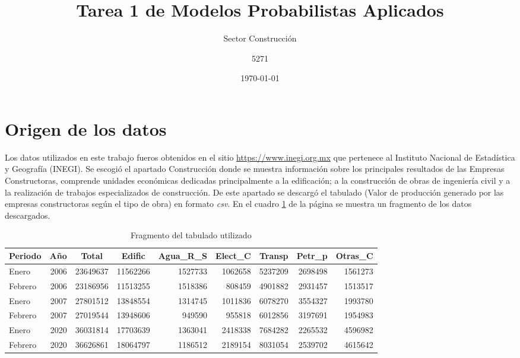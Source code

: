 \documentclass{article}
\title{Tarea 1 de Modelos Probabilistas Aplicados}
\subtitle{Sector Construcción}
\author{5271}
\date{\today}
\begin{document}
\maketitle

\section{Origen de los datos}

Los datos utilizados en este trabajo fueros obtenidos en el sitio \href{https://www.inegi.org.mx/default.html}{https://www.inegi.org.mx} que pertenece al Instituto Nacional de Estadística y Geografía (INEGI). Se escogió el apartado Construcción donde se muestra información sobre los principales resultados de las Empresas Constructoras, comprende unidades económicas dedicadas principalmente a la edificación; a la construcción de obras de ingeniería civil y a la realización de trabajos especializados de construcción. De este apartado se descargó el tabulado (Valor de producción generado por las empresas constructoras según el tipo de obra) en formato \textit{csv}. En el cuadro \ref{tab:frac} de la página \pageref{tab:frac} se muestra un fragmento de los datos descargados. 

\begin{table}[H]
  \centering
  \caption{Fragmento del tabulado utilizado}
    \begin{tabular}{lrrrrrrrr}
    \toprule
    \multicolumn{1}{c}{\textbf{Periodo}} & \multicolumn{1}{c}{\textbf{Año}} & \multicolumn{1}{c}{\textbf{Total}} & \multicolumn{1}{c}{\textbf{Edific}} & \multicolumn{1}{c}{\textbf{Agua\_R\_S}} & \multicolumn{1}{c}{\textbf{Elect\_C}} & \multicolumn{1}{c}{\textbf{Transp}} & \multicolumn{1}{c}{\textbf{Petr\_p}} & \multicolumn{1}{c}{\textbf{Otras\_C}} \\
    \midrule
    Enero & 2006  & 23649637 & 11562266 & 1527733 & 1062658 & 5237209 & 2698498 & 1561273 \\
    Febrero & 2006  & 23186956 & 11513255 & 1518386 & 808459 & 4901882 & 2931457 & 1513517 \\
    Enero & 2007  & 27801512 & 13848554 & 1314745 & 1011836 & 6078270 & 3554327 & 1993780 \\
    Febrero & 2007  & 27019544 & 13948606 & 949590 & 955818 & 6012856 & 3197691 & 1954983 \\
    Enero & 2020  & 36031814 & 17703639 & 1363041 & 2418338 & 7684282 & 2265532 & 4596982 \\
    Febrero & 2020  & 36626861 & 18064797 & 1186512 & 2189154 & 8031054 & 2539702 & 4615642 \\
    \bottomrule
    \end{tabular}%
  \label{tab:frac}%
\end{table}%
\end{document}
